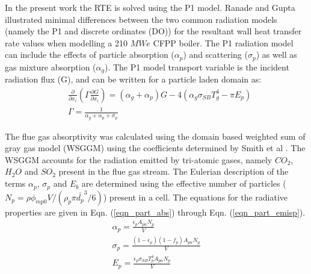 \documentclass[twocolumn,10pt]{asme2ej}
\begin{document}
In the present work the RTE is solved using the P1 model. Ranade and Gupta \cite{Ranade2015} illustrated minimal differences between the two common radiation models (namely the P1 and discrete ordinates (DO)) for the resultant wall heat transfer rate values when modelling a 210 $MWe$ CFPP boiler. The P1 radiation model can include the effects of particle absorption ($\alpha_p$) and scattering ($\sigma_p$) as well as gas mixture absorption ($\alpha_g$). The P1 model transport variable is the incident radiation flux (G), and can be written for a particle laden domain as:
\begin{equation}
\begin{split}
&\frac{\partial}{\partial x_{i}}\left(\Gamma\frac{\partial G}{\partial x_{i}}\right)=\left(\alpha_g+\alpha_p\right)G-4\left(\alpha_g \sigma_{SB} T_{g}^4-\pi E_p \right)\\
&\Gamma = \frac{1}{\alpha_g+\alpha_p+\sigma_p}
\end{split}
\end{equation}

The flue gas absorptivity was calculated using the domain based weighted sum of gray gas model (WSGGM) using the coefficients determined by Smith et al \cite{Smith1982}. The WSGGM accounts for the radiation emitted by tri-atomic gases, namely $CO_2$, $H_2O$ and $SO_2$ present in the flue gas stream. The Eulerian description of the terms $\alpha_p$, $\sigma_p$ and $E_b$ are determined using the effective number of particles ($N_p = \rho \phi_{mp0} V / \left( \rho_p \pi \bar{d_p}^3 /6 \right)$) present in a cell. The equations for the radiative properties are given in Eqn. (\ref{eqn_part_abs}) through Eqn. (\ref{eqn_part_emisp}).
\begin{gather}
\alpha_p = \frac{\epsilon_p A_{pn}N_p}{V} \label{eqn_part_abs}\\
\sigma_p = \frac{(1-\epsilon_p)(1-f_p) A_{pn}N_p}{V} \label{eqn_part_scat} \\
E_p = \frac{\epsilon_p \sigma_{SB} T_p^4 A_{pn}N_p}{V}\label{eqn_part_emisp}
\end{gather}
\end{document}
